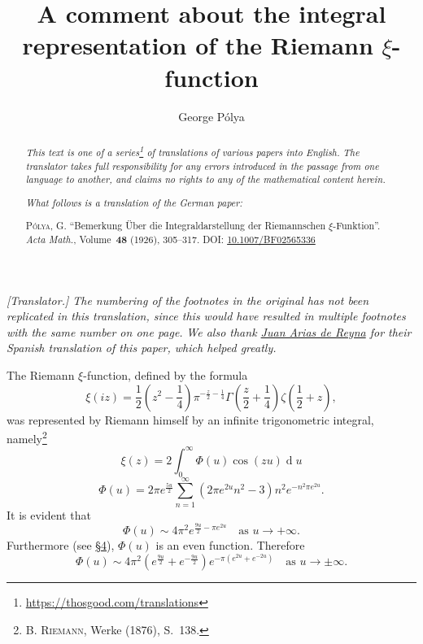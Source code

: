\documentclass{article}
\title{A comment about the integral representation of the Riemann $\xi$-function}
\author{George P\'{o}lya}
\date{}
\newcommand{\doctype}{German paper}
\newcommand{\origcit}{%
  \textsc{P\'{o}lya, G.}
  ``Bemerkung \"{U}ber die Integraldarstellung der Riemannschen $\xi$-Funktion''.
  \emph{Acta Math.}, Volume~\textbf{48} (1926), 305--317.
  \textsc{DOI:} \href{https://doi.org/10.1007/BF02565336}{10.1007/BF02565336}%
}
\theoremstyle{plain}
\newcommand{\dd}{\operatorname{d}\!}
\newcommand{\oldpage}[1]{\marginpar{\footnotesize$\Big\vert$ \textit{p.~#1}}}
\begin{document}
\maketitle
\thispagestyle{fancy}

\renewcommand{\abstractname}{Translator's note.}

\begin{abstract}
  \renewcommand*{\thefootnote}{\fnsymbol{footnote}}
  \emph{This text is one of a series\footnote{\url{https://thosgood.com/translations}} of translations of various papers into English.}
  \emph{The translator takes full responsibility for any errors introduced in the passage from one language to another, and claims no rights to any of the mathematical content herein.}

  \medskip
  
  \emph{What follows is a translation of the \doctype:}

  \medskip\noindent
  \origcit
\end{abstract}

\setcounter{footnote}{0}

\bigskip



\emph{[Translator.] The numbering of the footnotes in the original has not been replicated in this translation, since this would have resulted in multiple footnotes with the same number on one page.}
\emph{We also thank \href{https://personal.us.es/arias/}{Juan Arias de Reyna} for their Spanish translation of this paper, which helped greatly.}

\bigskip

The Riemann $\xi$-function, defined by the formula
\oldpage{305}
\[
\label{1}
  \xi(iz)
  =
  \frac12 \left(
    z^2 - \frac14
  \right) \pi^{-\frac{z}{2}-\frac14} \Gamma \left(
    \frac{z}{2} + \frac14
  \right) \zeta \left(
    \frac12 + z
  \right),
\tag{1}
\]
was represented by Riemann himself by an infinite trigonometric integral, namely\footnote{\textsc{B. Riemann}, Werke (1876), S.~138.}
\[
\label{2}
  \xi(z) = 2\int_0^\infty \Phi(u)\cos(zu)\dd u
\tag{2}
\]
\[
\label{3}
  \Phi(u) = 2\pi e^{\frac{5u}{2}} \sum_{n=1}^\infty (2\pi e^{2u}n^2 - 3) n^2 e^{-n^2\pi e^{2u}}.
\tag{3}
\]
It is evident that
\[
\label{4}
  \Phi(u) \sim 4\pi^2 e^{\frac{9u}{2}-\pi e^{2u}}
  \quad\mbox{as $u\to+\infty$.}
\tag{4}
\]
Furthermore (see \hyperref[section4]{\S4}), $\Phi(u)$ is an even function.
Therefore
\[
\label{5}
  \Phi(u) \sim 4\pi^2 \left(
    e^{\frac{9u}{2}} + e^{-\frac{9u}{2}}
  \right) e^{-\pi(e^{2u}+e^{-2u})}
  \quad\mbox{as $u\to\pm\infty$.}
\tag{5}
\]
\end{document}
